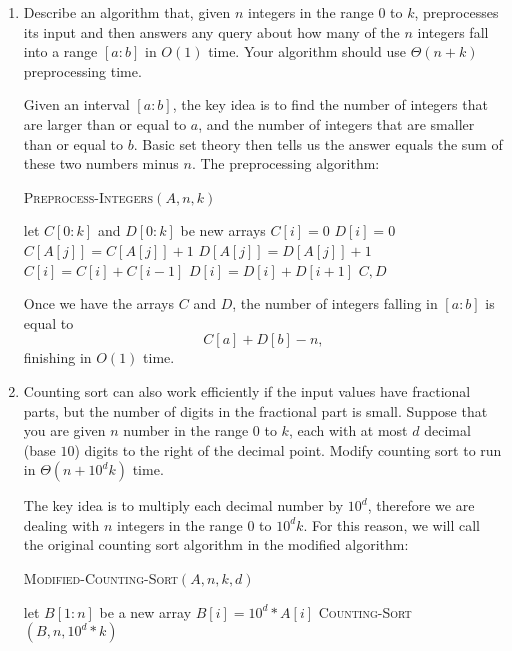 \documentclass[12pt,reqno]{amsart}
\newif\ifanswer
\begin{document}
\begin{enumerate}[1.]
\item Describe an algorithm that, given $n$ integers in the range $0$ to $k$, preprocesses its input and then answers any query about how many of the $n$ integers fall into a range $[a:b]$ in $O(1)$ time. Your algorithm should use $\Theta(n + k)$ preprocessing time.
\vspace{0.5cm}

\ifanswer
{}

\noindent Given an interval $[a:b]$, the key idea is to find the number of integers that are larger than or equal to $a$, and the number of integers that are smaller than or equal to $b$. Basic set theory then tells us the answer equals the sum of these two numbers minus $n$. The preprocessing algorithm:
\begin{algorithm}
    \caption{\textsc{Preprocess-Integers}$(A, n, k)$}
    \begin{algorithmic}[1]
        \STATE let $C[0:k]$ and $D[0:k]$ be new arrays
            \STATE $C[i] = 0$
            \STATE $D[i] = 0$
        \ENDFOR
            \STATE $C[A[j]] = C[A[j]] + 1$
            \STATE $D[A[j]] = D[A[j]] + 1$
        \ENDFOR
            \STATE $C[i] = C[i] + C[i - 1]$
        \ENDFOR
            \STATE $D[i] = D[i] + D[i + 1]$
        \ENDFOR
        \RETURN $C, D$
    \end{algorithmic}
\end{algorithm}

\noindent Once we have the arrays $C$ and $D$, the number of integers falling in $[a:b]$ is equal to $$C[a] + D[b] - n,$$ finishing in $O(1)$ time.
\vspace{1cm}


\item Counting sort can also work efficiently if the input values have fractional parts, but the number of digits in the fractional part is small. Suppose that you are given $n$ number in the range $0$ to $k$, each with at most $d$ decimal (base $10$) digits to the right of the decimal point. Modify counting sort to run in $\Theta(n + {10}^dk)$ time.
\vspace{0.5cm}

\ifanswer
{}

\noindent The key idea is to multiply each decimal number by ${10}^d$, therefore we are dealing with $n$ integers in the range $0$ to ${10}^dk$. For this reason, we will call the original counting sort algorithm in the modified algorithm:
\begin{algorithm}
    \caption{\textsc{Modified-Counting-Sort}$(A, n, k, d)$}
    \begin{algorithmic}[1]
        \STATE let $B[1:n]$ be a new array
            \STATE $B[i] = {10}^d * A[i]$
        \ENDFOR
        \RETURN \textsc{Counting-Sort}$(B, n, {10}^d * k)$
    \end{algorithmic}
\end{algorithm}
\vspace{1cm}



\end{enumerate}
\end{document}
